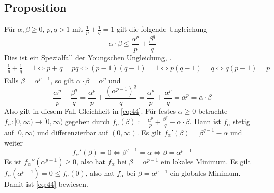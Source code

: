 \subsection[Proposition: Speziallfall der Youngschen Ungleichung]{Proposition} %
\label{sub:44}
Für $\alpha, \beta \ge 0$, $p,q >1$ mit $\frac{1}{p} + \frac{1}{q}=1$ gilt die folgende Ungleichung
\begin{equation*}
	\alpha \cdot \beta \le \frac{\alpha^p}{p} + \frac{\beta^q}{q}  \label{eq:44}\tag{\#}
\end{equation*}
Dies ist ein Spezialfall der Youngschen Ungleichung,  .
\begin{align*}
	\frac{1}{p} + \frac{1}{q}=1 \iff p+q= pq \iff (p-1)(q-1)= 1 \iff p (q-1) = q \iff q (p-1) =p
\end{align*}
Falls $\beta = \alpha^{p-1}$, so gilt $\alpha \cdot \beta = \alpha^p$ und 
\[
	\frac{\alpha^p}{p} + \frac{\beta^q}{q} = \frac{\alpha^p}{p} + \frac{(\alpha^{p-1})^q}{q} = \frac{\alpha^p}{p} + \frac{\alpha^p}{q} = \alpha^p = \alpha \cdot \beta   
\]
Also gilt in diesem Fall Gleichheit in \eqref{eq:44}. Für festes $\alpha \ge 0$ betrachte $f_\alpha \colon [0,\infty) \to [0,\infty)$ gegeben durch
$f_\alpha(\beta) := \frac{\alpha^p}{p} + \frac{\beta^q}{q} - \alpha \cdot \beta$. Dann ist $f_\alpha$ stetig auf $[0,\infty)$ und differenzierbar auf $(0,\infty)$. Es gilt
$f_\alpha'(\beta) = \beta^{q-1} -\alpha$ und weiter
\[
	f_\alpha'(\beta)=0 \iff \beta^{q-1} = \alpha \iff \beta= \alpha^{p-1}
\]
Es ist $f_\alpha''(\alpha^{p-1}) \ge 0$, also hat $f_\alpha$ bei $\beta = \alpha^{p-1}$ ein lokales Minimum. Es gilt $f_\alpha(\alpha^{p-1})= 0 \le f_\alpha(0)$, also
hat $f_\alpha$ bei $\beta=\alpha^{p-1}$ ein globales Minimum. Damit ist \eqref{eq:44} bewiesen. \bewende

